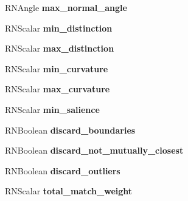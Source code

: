 \begin{DoxyCompactItemize}
\item 
R\+N\+Angle {\bfseries max\+\_\+normal\+\_\+angle}\hypertarget{struct_f_e_t_reconstruction_a61622c47020e7a50e8119c6e617b0dcb}{}\label{struct_f_e_t_reconstruction_a61622c47020e7a50e8119c6e617b0dcb}

\item 
R\+N\+Scalar {\bfseries min\+\_\+distinction}\hypertarget{struct_f_e_t_reconstruction_a4ab61b8d1cde3ff846979f3ec07e6ee4}{}\label{struct_f_e_t_reconstruction_a4ab61b8d1cde3ff846979f3ec07e6ee4}

\item 
R\+N\+Scalar {\bfseries max\+\_\+distinction}\hypertarget{struct_f_e_t_reconstruction_a01ef6e8619830fc4d8c962f7addb9fcd}{}\label{struct_f_e_t_reconstruction_a01ef6e8619830fc4d8c962f7addb9fcd}

\item 
R\+N\+Scalar {\bfseries min\+\_\+curvature}\hypertarget{struct_f_e_t_reconstruction_a0f2220bced8871a0e80e047b48f0fd5e}{}\label{struct_f_e_t_reconstruction_a0f2220bced8871a0e80e047b48f0fd5e}

\item 
R\+N\+Scalar {\bfseries max\+\_\+curvature}\hypertarget{struct_f_e_t_reconstruction_a4f8cb7f8d7d70e7a9d7c795608c20847}{}\label{struct_f_e_t_reconstruction_a4f8cb7f8d7d70e7a9d7c795608c20847}

\item 
R\+N\+Scalar {\bfseries min\+\_\+salience}\hypertarget{struct_f_e_t_reconstruction_a764b6ca2450d76a2fbca5f9b13ec4d0f}{}\label{struct_f_e_t_reconstruction_a764b6ca2450d76a2fbca5f9b13ec4d0f}

\item 
R\+N\+Boolean {\bfseries discard\+\_\+boundaries}\hypertarget{struct_f_e_t_reconstruction_a23403c28fb0e30dca17bd1be0c6a4536}{}\label{struct_f_e_t_reconstruction_a23403c28fb0e30dca17bd1be0c6a4536}

\item 
R\+N\+Boolean {\bfseries discard\+\_\+not\+\_\+mutually\+\_\+closest}\hypertarget{struct_f_e_t_reconstruction_aba9dce274dc0c69d996513deb46cc9eb}{}\label{struct_f_e_t_reconstruction_aba9dce274dc0c69d996513deb46cc9eb}

\item 
R\+N\+Boolean {\bfseries discard\+\_\+outliers}\hypertarget{struct_f_e_t_reconstruction_ae75758ba4c2037039d1d13976995d732}{}\label{struct_f_e_t_reconstruction_ae75758ba4c2037039d1d13976995d732}

\item 
R\+N\+Scalar {\bfseries total\+\_\+match\+\_\+weight}\hypertarget{struct_f_e_t_reconstruction_a576429eb6f779741349082a33b11fd2d}{}\label{struct_f_e_t_reconstruction_a576429eb6f779741349082a33b11fd2d}


\end{DoxyCompactItemize}
